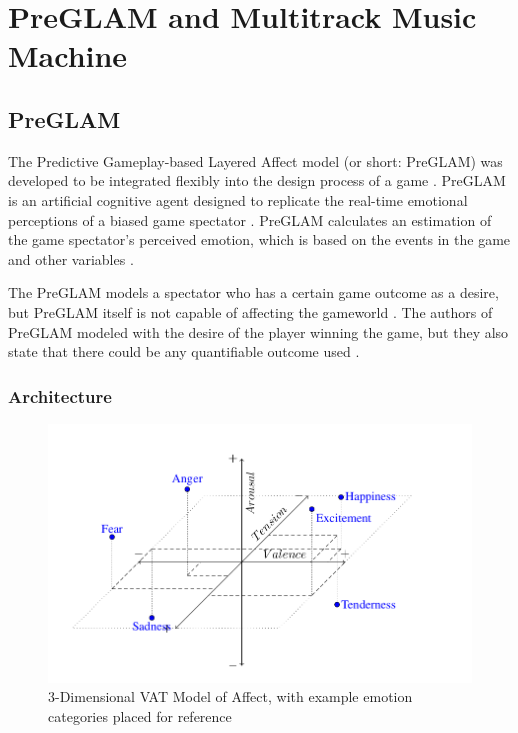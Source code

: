 \section{PreGLAM and Multitrack Music Machine}

\subsection{PreGLAM}

The Predictive Gameplay-based Layered Affect model (or short: PreGLAM)
was developed to be integrated flexibly into the design process of a 
game \cite{plut2023preglam}. PreGLAM is an artificial cognitive agent
designed to replicate the real-time emotional perceptions of a biased 
game spectator \cite{plut2023preglam}. PreGLAM calculates an estimation
of the game spectator's perceived emotion, which is based on the 
events in the game and other variables \cite{plut2023preglam}.

The PreGLAM models a spectator who has a certain game outcome as
a desire, but PreGLAM itself is not capable of affecting the gameworld
\cite{plut2023preglam}. The authors of PreGLAM modeled with the desire
of the player winning the game, but they also state that there could 
be any quantifiable outcome used \cite{plut2023preglam}.

\subsubsection{Architecture}

\begin{figure}[h]
    \centering
    \includegraphics[width=\linewidth]{images/vat_model.png}
    \caption{3-Dimensional VAT Model of Affect, with example emotion categories placed for reference \cite{plut2023preglam}}
    \label{fig:vat_model}
\end{figure}

